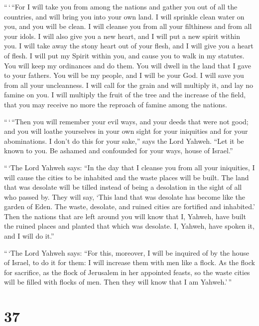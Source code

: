  ``\,`\,``For I will take you from among the nations and
gather you out of all the countries, and will bring you into your own
land.  I will sprinkle clean water on you, and you will
be clean. I will cleanse you from all your filthiness and from all your
idols.  I will also give you a new heart, and I will put
a new spirit within you. I will take away the stony heart out of your
flesh, and I will give you a heart of flesh.  I will put
my Spirit within you, and cause you to walk in my statutes. You will
keep my ordinances and do them.  You will dwell in the
land that I gave to your fathers. You will be my people, and I will be
your God.  I will save you from all your uncleanness. I
will call for the grain and will multiply it, and lay no famine on you.
 I will multiply the fruit of the tree and the increase
of the field, that you may receive no more the reproach of famine among
the nations.

 ``\,`\,``Then you will remember your evil ways, and your
deeds that were not good; and you will loathe yourselves in your own
sight for your iniquities and for your abominations.  I
don't do this for your sake,'' says the Lord Yahweh. ``Let it be known
to you. Be ashamed and confounded for your ways, house of Israel.''

 ``\,`The Lord Yahweh says: ``In the day that I cleanse
you from all your iniquities, I will cause the cities to be inhabited
and the waste places will be built.  The land that was
desolate will be tilled instead of being a desolation in the sight of
all who passed by.  They will say, `This land that was
desolate has become like the garden of Eden. The waste, desolate, and
ruined cities are fortified and inhabited.'  Then the
nations that are left around you will know that I, Yahweh, have built
the ruined places and planted that which was desolate. I, Yahweh, have
spoken it, and I will do it.''

 ``\,`The Lord Yahweh says: ``For this, moreover, I will
be inquired of by the house of Israel, to do it for them: I will
increase them with men like a flock.  As the flock for
sacrifice, as the flock of Jerusalem in her appointed feasts, so the
waste cities will be filled with flocks of men. Then they will know that
I am Yahweh.'\,''

\hypertarget{section-36}{%
\section{37}\label{section-36}}

